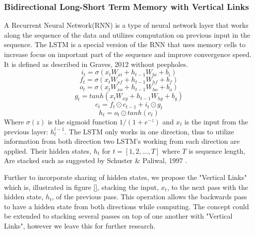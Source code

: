 \documentclass{article}
\begin{document}
\subsubsection{Bidirectional Long-Short Term Memory with Vertical Links}
\label{sssec:blstm}
A Recurrent Neural Network(RNN) is a type of neural network layer that works along the sequence of the data and utilizes computation on previous input in the sequence\cite{}. The LSTM is a special version of the RNN that uses memory cells to increase focus on important part of the sequence and improve convergence speed. It is defined as described in Graves, 2012\cite{Graves2012} without peepholes.
\begin{equation} \label{eq:3}
i_t = \sigma(x_tW_{xi}+h_{t-1}W_{hi}+b_i)
\end{equation}
\begin{equation}
f_t = \sigma(x_tW_{xf}+h_{t-1}W_{hf}+b_f)
\end{equation}
\begin{equation}
o_t = \sigma(x_tW_{xo}+h_{t-1}W_{ho}+b_o)
\end{equation}
\begin{equation}
g_t = tanh(x_tW_{xg}+h_{t-1}W_{hg}+b_g)
\end{equation}
\begin{equation}
c_t = f_t\odot c_{t-1}+i_t\odot g_t
\end{equation}
\begin{equation}
h_t = o_t \odot tanh(c_t)
\end{equation}
Where $\sigma(z)$ is the sigmoid function $1/(1+e^{-z})$ and $x_t$ is the input from the previous layer: $h_t^{l-1}$.
The LSTM only works in one direction, thus to utilize information from both direction two LSTM's working from each direction are applied. Their hidden states, $h_t$ for $t = [1, 2, ..., T]$ where $T$ is sequence length, Are stacked such as suggested by Schuster \& Paliwal, 1997 \cite{Schuster1997}.

Further to incorporate sharing of hidden states, we propose the "Vertical Links" which is, illustrated in figure \ref{}, stacking the input, $x_t$, to the next pass with the hidden state, $h_t$, of the previous pass. This operation allows the backwards pass to have a hidden state from both directions while computing. The concept could be extended to stacking several passes on top of one another with "Vertical Links", however we leave this for further research.
\end{document}
